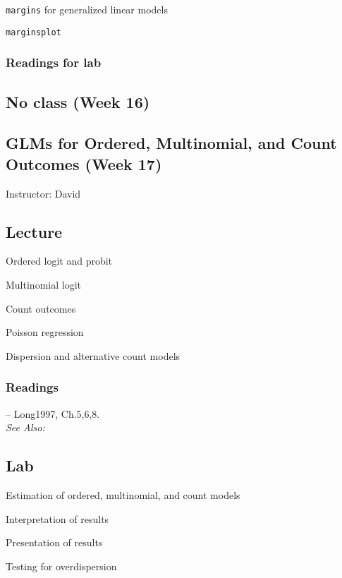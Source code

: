 \documentclass[11pt,a4paper]{article}
\newcommand{\textbook}[2][]{\noindent -- {#2}, {#1}.\vspace{.25em}\\}
\newcommand{\david}{\vspace{1em}\noindent Instructor: David\vspace{1em}\\}
\newcommand{\seealso}{\noindent \emph{See Also:}\\}
\begin{document}
\begin{itemize*}
\item \texttt{margins} for generalized linear models
\item \texttt{marginsplot}
\end{itemize*}

\subsubsection*{Readings for lab}



\clearpage
\subsection*{No class (Week 16)} %


\clearpage
\subsection{GLMs for Ordered, Multinomial, and Count Outcomes (Week 17)}
\emph{}

\david

\subsection*{Lecture}
\begin{itemize*}
\item Ordered logit and probit
\item Multinomial logit
\item Count outcomes
    \begin{itemize*}
    \item Poisson regression
    \item Dispersion and alternative count models
    \end{itemize*}
\end{itemize*}

\subsubsection*{Readings}
\textbook[Ch.5,6,8]{Long1997}

\seealso


\subsection*{Lab}

\begin{itemize*}
\item Estimation of ordered, multinomial, and count models
\item Interpretation of results
\item Presentation of results
\item Testing for overdispersion
\end{itemize*}
\end{document}
